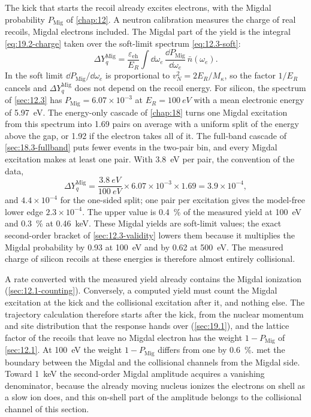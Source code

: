 The kick that starts the recoil already excites electrons, with the Migdal probability $P_{\mathrm{Mig}}$ of \cref{chap:12}. A neutron calibration measures the charge of real recoils, Migdal electrons included. The Migdal part of the yield is the integral \cref{eq:19.2-charge} taken over the soft-limit spectrum \cref{eq:12.3-soft}:
\begin{equation}
  \Delta Y_q^{\mathrm{Mig}} = \frac{\varepsilon_{\mathrm{eh}}}{E_R}\int\dd\omega_e\,\frac{\dd P_{\mathrm{Mig}}}{\dd\omega_e}\,\bar n(\omega_e) .
  \label{eq:19.2-Ymig}
\end{equation}
In the soft limit $\dd P_{\mathrm{Mig}}/\dd\omega_e$ is proportional to $v_N^2 = 2E_R/M_\kappa$, so the factor $1/E_R$ cancels and $\Delta Y_q^{\mathrm{Mig}}$ does not depend on the recoil energy. For silicon, the spectrum of \cref{sec:12.3} has $P_{\mathrm{Mig}} = 6.07\times10^{-3}$ at $E_R = \SI{100}{eV}$ with a mean electronic energy of \SI{5.97}{eV}. The energy-only cascade of \cref{chap:18} turns one Migdal excitation from this spectrum into 1.69 pairs on average with a uniform split of the energy above the gap, or 1.92 if the electron takes all of it. The full-band cascade of \cref{sec:18.3-fullband} puts fewer events in the two-pair bin, and every Migdal excitation makes at least one pair. With \SI{3.8}{eV} per pair, the convention of the data,
\begin{equation*}
  \Delta Y_q^{\mathrm{Mig}} = \frac{\SI{3.8}{eV}}{\SI{100}{eV}}\times6.07\times10^{-3}\times1.69 = 3.9\times10^{-4} ,
\end{equation*}
and $4.4\times10^{-4}$ for the one-sided split; one pair per excitation gives the model-free lower edge $2.3\times10^{-4}$. The upper value is \SI{0.4}{\percent} of the measured yield at \SI{100}{eV} and \SI{0.3}{\percent} at \SI{0.46}{keV}. These Migdal yields are soft-limit values; the exact second-order bracket of \cref{sec:12.3-validity} lowers them because it multiplies the Migdal probability by 0.93 at \SI{100}{eV} and by 0.62 at \SI{500}{eV}. The measured charge of silicon recoils at these energies is therefore almost entirely collisional.

A rate converted with the measured yield already contains the Migdal ionization (\cref{sec:12.1-counting}). Conversely, a computed yield must count the Migdal excitation at the kick and the collisional excitation after it, and nothing else. The trajectory calculation therefore starts after the kick, from the nuclear momentum and site distribution that the response hands over (\cref{sec:19.1}), and the lattice factor of the recoils that leave no Migdal electron has the weight $1 - P_{\mathrm{Mig}}$ of \cref{sec:12.1}. At \SI{100}{eV} the weight $1 - P_{\mathrm{Mig}}$ differs from one by \SI{0.6}{\percent}.  met the boundary between the Migdal and the collisional channels from the Migdal side. Toward \SI{1}{keV} the second-order Migdal amplitude acquires a vanishing denominator, because the already moving nucleus ionizes the electrons on shell as a slow ion does, and this on-shell part of the amplitude belongs to the collisional channel of this section.

